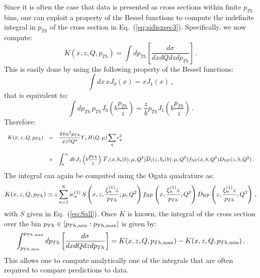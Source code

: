 \documentclass[10pt,a4paper]{article}
\begin{document}
Since it is often the case that data is presented as cross sections
within finite $p_{Th}$ bins, one can exploit a property of the Bessel
functions to compute the indefinite integral in $p_{Th}$ of the cross
section in Eq.~(\ref{eq:sidisxsec3}). Specifically, we now compute:
\begin{equation}
K(x,z,Q,p_{Th}) = \int dp_{Th}\left[\frac{d\sigma}{dxdQdz d p_{Th}}\right]\,.
\end{equation}
This is easily done by using the following property of the Bessel
functions:
\begin{equation}
\int dx\,x J_0(x) = xJ_1(x)\,,
\end{equation}
that is equivalent to:
\begin{equation}
\int dp_{Th}\,p_{Th} J_0\left(b\frac{p_{Th}}{z}\right) = \frac{z}{b}p_{Th}J_1\left(b\frac{p_{Th}}{z}\right)\,.
\end{equation}
Therefore:
\begin{equation}\label{eq:sidisxsec3}
\begin{array}{rcl}
\displaystyle   K(x,z,Q,p_{Th}) &=&\displaystyle
\frac{4\pi \alpha^2p_{Th}}{xz^2Q^3}Y_+ H(Q,\mu) \sum_q e_q^2\\
\\
&\times&\displaystyle 
  \int_0^\infty db\, J_1\left(b\frac{p_{Th}}{z}\right)
         \,\overline{F}_i(x,b_*(b);\mu,Q^2)
         \overline{D}_i(z,b_*(b);\mu,Q^2) f_{\rm NP}(x,b,Q^2) D_{\rm NP}(z,b,Q^2)\,.
\end{array}
\end{equation}
The integral can again be computed using the Ogata quadrature as:
\begin{equation}\label{eq:primitivepTh}
\displaystyle   K(x,z,Q,p_{Th}) \simeq \displaystyle z
  \sum_{n=1}^N w_n^{(1)}
         \,S\left(x,z,\frac{\xi_n^{(1)}z}{p_{Th}};\mu,Q^2\right) f_{\rm NP}\left(x, \frac{\xi_n^{(1)}z}{p_{Th}},Q^2\right) D_{\rm NP}\left(z, \frac{\xi_n^{(1)}z}{p_{Th}},Q^2\right)\,,
\end{equation}
with $S$ given in Eq.~(\ref{eq:Sall}). Once $K$ is known, the integral
of the cross section over the bin
$p_{Th}\in [p_{Th,\rm min}: p_{Th,\rm max}]$ is given by:
\begin{equation}
\int_{p_{Th,\rm min}}^{p_{Th,\rm max}} dp_{Th}\left[\frac{d\sigma}{dxdQdz d
    p_{Th}}\right]=K(x,z,Q,p_{Th,\rm max})-K(x,z,Q,p_{Th,\rm min})\,.
\end{equation}
This allows one to compute analytically one of the integrals that are
often required to compare predictions to data. 
\end{document}
